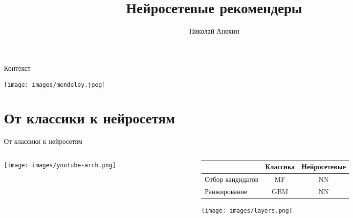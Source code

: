 \documentclass[11pt,aspectratio=169]{beamer}
\author{Николай Анохин}
\title{Нейросетевые рекомендеры}
\begin{document}
{

\begin{frame}
\titlepage
\end{frame}


}

\begin{frame}{Контекст}

\begin{center}
\texttt{[image: images/mendeley.jpeg]}
\end{center}

\end{frame}

\section{От классики к нейросетям}

\begin{frame}{От классики к нейросетям}

\begin{columns}
\begin{column}{0.4\textwidth} 
\begin{center}
\texttt{[image: images/youtube-arch.png]}
\end{center}
\end{column}
\begin{column}{0.5\textwidth}

\begin{small}
\begin{tabular}{l c c}
 & Классика & Нейросетевые \\
\hline
Отбор кандидатов & MF & NN \\
Ранжирование & GBM & NN
\end{tabular}

\begin{center}
\texttt{[image: images/layers.png]}
\end{center}

\end{small}

\end{column}
\end{columns}

\end{frame}
\end{document}

